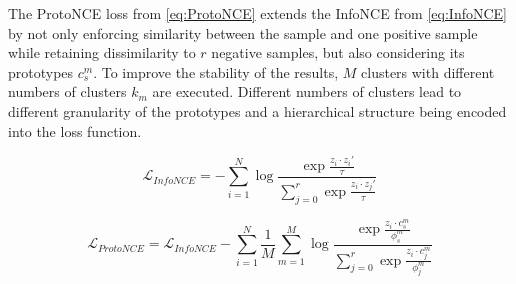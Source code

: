 The ProtoNCE loss from \eqref{eq:ProtoNCE} extends the InfoNCE from \eqref{eq:InfoNCE} 
by not only enforcing similarity between the sample and 
one positive sample while retaining dissimilarity to $r$ negative samples, 
but also considering its prototypes $c^m_s$. 
To improve the stability of the results, $M$ clusters with different numbers of clusters $k_m$ are 
executed.
Different numbers of clusters lead to different granularity of the prototypes 
and a hierarchical structure being encoded into the loss function.

\begin{equation}
    \mathcal{L}_{InfoNCE}= - \sum_{i=1}^{N}\log\frac{\exp \frac{z_i\cdot z_i'}{\tau}}{\sum_{j=0}^{r}\exp \frac{z_i\cdot z_j'}{\tau}}
    \label{eq:InfoNCE}
\end{equation}

\begin{equation}
    \mathcal{L}_{ProtoNCE}=\mathcal{L}_{InfoNCE} - \sum_{i=1}^{N} \frac{1}{M} \sum_{m=1}^{M} \log\frac{\exp \frac{z_i\cdot c_s^m}{\phi^m_s}}{\sum_{j=0}^{r}\exp \frac{z_i\cdot c_j^m}{\phi^m_j}}
    \label{eq:ProtoNCE}
\end{equation}

